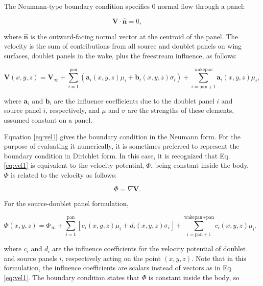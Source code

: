 \documentclass[11pt]{article}
\begin{document}
The Neumann-type boundary condition specifies 0 normal flow through a panel:

\begin{equation}
\mathbf{V}\cdot{\mathbf{\hat{n}}} = 0,
\label{eq:bc1}
\end{equation}

\noindent where $\mathbf{\hat{n}}$ is the outward-facing normal vector at the centroid of
the panel. The velocity is the sum of contributions from all source and doublet panels on
wing surfaces, doublet panels in the wake, plus the freestream influence, as follows:

\begin{equation}
\mathbf{V}(x,y,z) = \mathbf{V}_\infty
                  + \sum_{i=1}^{\text{pan}}\left(\mathbf{a}_i(x,y,z)\mu_i
                  +                              \mathbf{b}_i(x,y,z)\sigma_i\right)
                  + \sum_{i=\text{pan}+1}^{\text{wakepan}}\mathbf{a}_i(x,y,z)\mu_i,
\label{eq:vel1}
\end{equation}

\noindent where $\mathbf{a}_i$ and $\mathbf{b}_i$ are the influence
coefficients due to the
doublet panel $i$ and source panel $i$, respectively, and $\mu$ and $\sigma$ are
the strengths of these elements, assumed constant on a panel.

Equation \ref{eq:vel1} gives the boundary condition in the Neumann form. For the purpose
of evaluating it numerically, it is sometimes preferred to represent the boundary
condition in Dirichlet form. In this case, it is recognized that Eq. \ref{eq:vel1} is
equivalent to the velocity potential, $\Phi$, being constant inside the body. $\Phi$ is
related to the velocity as follows:

\begin{equation}
\Phi = \nabla\mathbf{V}.
\label{eq:phi1}
\end{equation}

For the source-doublet panel formulation,

\begin{equation}
\Phi(x,y,z) = \Phi_\infty
            + \sum_{i=1}^{\text{pan}}\left[c_i(x,y,z)\mu_i + d_i(x,y,z)\sigma_i\right]
            + \sum_{i=\text{pan}+1}^{\text{wakepan}+\text{pan}}c_i(x,y,z)\mu_i,
\label{eq:phi2}
\end{equation}

\noindent where $c_i$ and $d_i$ are the influence coefficients for the velocity potential
of doublet and source panels $i$, respectively acting on the point $(x,y,z)$. Note that in
this formulation, the influence coefficients are scalars instead of vectors as in Eq.
\ref{eq:vel1}. The boundary
condition states that $\Phi$ is constant inside the body, so
\end{document}
